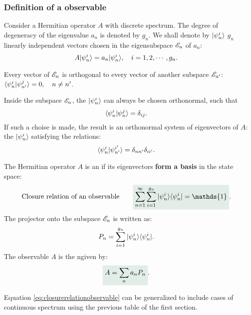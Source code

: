 \subsubsection{Definition of a observable}
Consider a Hermitian operator $A$ with discrete spectrum. The degree of degeneracy of the eigenvalue $a_n$ is denoted by $g_n$. We shall denote
by $|\psi_n^i\rangle$ $g_n$ linearly independent vectors chosen in the eigensubspace $\mathscr{E}_n$ of $a_n$:
\begin{align}
    A|\psi_n^i\rangle=a_n|\psi_n^i\rangle,\quad i=1,2,\cdots,g_n.
\end{align}

Every vector of $\mathscr{E}_n$ is orthogonal to every vector of another subspace $\mathscr{E}_{n'}$: $\langle\psi_n^i|\psi_{n'}^j\rangle=0,\quad n\neq n'$.

Inside the subspace $\mathscr{E}_n$, the $|\psi_n^i\rangle$ can always be chosen orthonormal, such that
\begin{align}
    \langle\psi_n^i|\psi_n^j\rangle=\delta_{ij}.
\end{align}
If such a choise is made, the result is an orthonormal system of eigenvectors of $A$: the $|\psi_n^i\rangle$ satisfying the relations:
\begin{align}
    \langle\psi_n^i|\psi_{n'}^{i'}\rangle=\delta_{nn'}\delta_{ii'}.
\end{align}

\begin{definition}[Observable]
    The Hermitian operator $A$ is an  if its eigenvectors \textbf{form a basis} in the state space:
    \begin{align}
        \text{Closure relation of an observable}\qquad\highlight{\sum_{n=1}^\infty\sum_{i=1}^{g_n}\ket{\psi_n^i}\bra{\psi_n^i}=\mathds{1}}.
        \label{eq:closurerelationobservable}
    \end{align}
    The projector onto the subspace $\mathscr{E}_n$ is written as:
    \begin{align}
        P_n=\sum_{i=1}^{g_n}|\psi_n^i\rangle\langle\psi_n^i|.
    \end{align}
    The observable $A$ is the ngiven by:
    \begin{align}
        \highlight{A=\sum_na_nP_n}.
    \end{align}
\end{definition}

Equation \eqref{eq:closurerelationobservable} can be generalized to include cases of continuous spectrum using the previous table of the first section.


